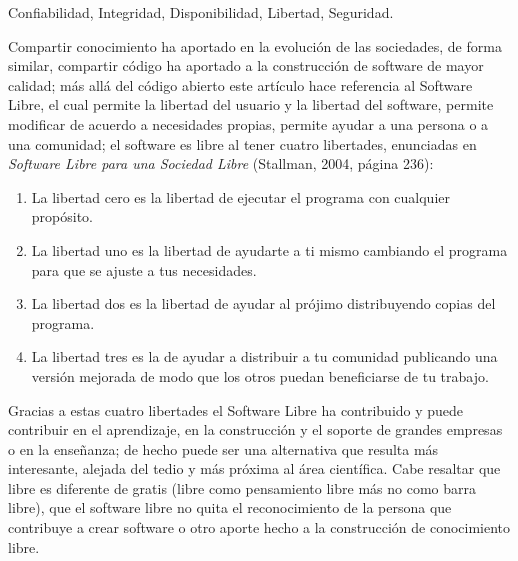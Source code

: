 \begin{multicols}{2}




 Confiabilidad, Integridad, Disponibilidad, Libertad, Seguridad.\\
\vspace{0.3cm}

Compartir conocimiento ha aportado en la evolución de las sociedades, de forma similar, compartir código ha aportado a la construcción de software de mayor calidad; más allá del código abierto este artículo hace referencia al Software Libre, el cual permite la libertad del usuario y la libertad del software, permite modificar de acuerdo a necesidades propias, permite ayudar a una persona o a una comunidad; el software es libre al tener cuatro libertades, enunciadas en \textit{Software Libre para una Sociedad Libre} (Stallman, 2004, página 236): 

\vspace{0.1cm}

\begin{enumerate}
	\item[0.] La libertad cero es la libertad de ejecutar el programa con cualquier propósito. 
	\item[1.] La libertad uno es la libertad de ayudarte a ti mismo cambiando el programa para que se ajuste a tus necesidades. 
    \item[2.] La libertad dos es la libertad de ayudar al prójimo distribuyendo copias del programa. 
    \item[3.] La libertad tres es la de ayudar a distribuir a tu comunidad publicando una versión mejorada de modo que los otros puedan beneficiarse de tu trabajo.
\end{enumerate}

\vspace{0.15cm}

Gracias a estas cuatro libertades el Software Libre ha contribuido y puede contribuir en el aprendizaje, en la construcción y el soporte de grandes empresas o en la enseñanza; de hecho puede ser una alternativa que resulta más interesante, alejada del tedio y más próxima al área científica. Cabe resaltar que libre es diferente de gratis (libre como pensamiento libre más no como barra libre), que el software libre no quita el reconocimiento de la persona que contribuye a crear software o otro aporte hecho a la construcción de conocimiento libre.


\end{multicols}
